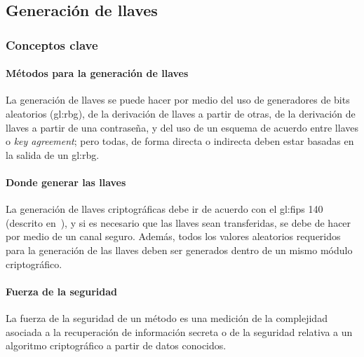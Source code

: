 %
%

\subsection{Generación de llaves}
\label{sec:generacion_llaves}


\subsubsection{Conceptos clave}

\paragraph{Métodos para la generación de llaves}
La generación de llaves se puede hacer por medio del uso de generadores de
bits aleatorios (\gls{gl:rbg}), de la derivación de llaves a partir de otras,
de la derivación de llaves a partir de una contraseña, y del uso de un esquema
de acuerdo entre llaves o \textit{key agreement}; pero todas, de forma directa
o indirecta deben estar basadas en la salida de un \gls{gl:rbg}.

\paragraph{Donde generar las llaves}
La generación de llaves criptográficas debe ir de acuerdo con el \gls{gl:fips}
140 (descrito en~\cite{nist_modulos_criptograficos}), y si es necesario que
las llaves sean transferidas, se debe de hacer por medio de un canal seguro.
Además, todos los valores aleatorios requeridos para la generación de las
llaves deben ser generados dentro de un mismo módulo criptográfico.

\paragraph{Fuerza de la seguridad}
La fuerza de la seguridad de un método es una medición de la complejidad
asociada a la recuperación de información secreta o de la seguridad relativa
a un algoritmo criptográfico a partir de datos conocidos.

